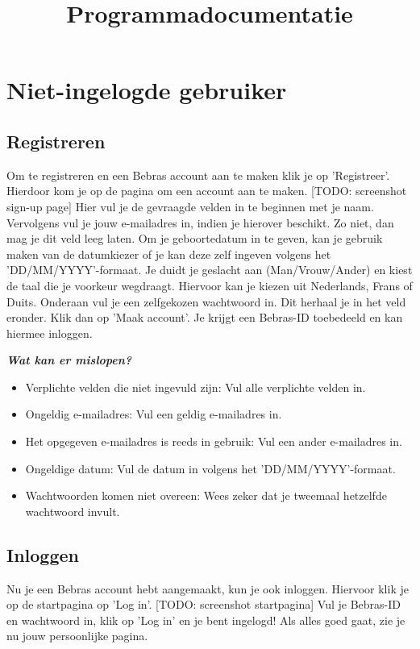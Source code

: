\documentclass[]{article}
\title{
    Programmadocumentatie
}
\begin{document}
\maketitle

\section{Niet-ingelogde gebruiker}

\subsection{Registreren}
Om te registreren en een Bebras account aan te maken klik je op 'Registreer'. Hierdoor kom je op de pagina om een account aan te maken. [TODO: screenshot sign-up page] Hier vul je de gevraagde velden in te beginnen met je naam. Vervolgens vul je jouw e-mailadres in, indien je hierover beschikt. Zo niet, dan mag je dit veld leeg laten. Om je geboortedatum in te geven, kan je gebruik maken van de datumkiezer of je kan deze zelf ingeven volgens het 'DD/MM/YYYY'-formaat. Je duidt je geslacht aan (Man/Vrouw/Ander) en kiest de taal die je voorkeur wegdraagt. Hiervoor kan je kiezen uit Nederlands, Frans of Duits. Onderaan vul je een zelfgekozen wachtwoord in. Dit herhaal je in het veld eronder. Klik dan op 'Maak account'. Je krijgt een Bebras-ID toebedeeld en kan hiermee inloggen.

\textbf{\textit{Wat kan er mislopen?}}

\begin{itemize}
\item Verplichte velden die niet ingevuld zijn: Vul alle verplichte velden in.
\item Ongeldig e-mailadres: Vul een geldig e-mailadres in.
\item Het opgegeven e-mailadres is reeds in gebruik: Vul een ander e-mailadres in.
\item Ongeldige datum: Vul de datum in volgens het 'DD/MM/YYYY'-formaat.
\item Wachtwoorden komen niet overeen: Wees zeker dat je tweemaal hetzelfde wachtwoord invult.
\end{itemize}

\subsection{Inloggen}
Nu je een Bebras account hebt aangemaakt, kun je ook inloggen. Hiervoor klik je op de startpagina op 'Log in'. [TODO: screenshot startpagina] Vul je Bebras-ID en wachtwoord in, klik op 'Log in' en je bent ingelogd! Als alles goed gaat, zie je nu jouw persoonlijke pagina. 
\end{document}
